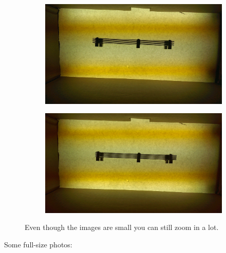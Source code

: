 \documentclass[10pt]{scrartcl}
\begin{document}
\begin{figure}[!ht]
    \hspace{-1.0in}
    \begin{subfigure}[b]{.45\linewidth}
        \centering
        \includegraphics[width=1.3\textwidth]{../plots_tables_images/slats/IMAG0124_BURST002_COVER.jpg}
        \caption{}
    \end{subfigure}
    \hspace{.5in}
    \begin{subfigure}[b]{.45\linewidth}
        \centering
        \includegraphics[width=1.3\textwidth]{../plots_tables_images/slats/IMAG0133_BURST003.jpg}
        \caption{}
    \end{subfigure}
    \caption{Even though the images are small you can still zoom in a lot.}
\end{figure}

Some full-size photos:
\end{document}
